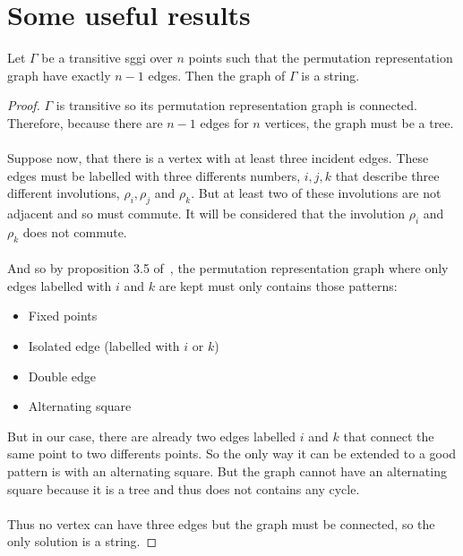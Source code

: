 \section{Some useful results}

\begin{lemma}\label{graphIsString}
  Let $\Gamma$ be a transitive sggi over $n$ points such that the permutation representation graph have exactly $n-1$ edges. Then the graph of $\Gamma$ is a string.
\end{lemma}

\begin{proof}
  $\Gamma$ is transitive so its permutation representation graph is connected. Therefore, because there are $n-1$ edges for $n$ vertices, the graph must be a tree.

  \paragraph{}
  Suppose now, that there is a vertex with at least three incident edges. These edges must be labelled with three differents numbers, $i, j, k$ that describe three different involutions, $\rho_i, \rho_j$ and $\rho_k$. But at least two of these involutions are not adjacent and so must commute. It will be considered that the involution $\rho_i$ and $\rho_k$ does not commute.

  \paragraph{}
  And so by proposition 3.5 of~\cite{cprGraph}, the permutation representation graph where only edges labelled with $i$ and $k$ are kept must only contains those patterns:
  \begin{itemize}
    \item Fixed points
    \item Isolated edge (labelled with $i$ or $k$)
    \item Double edge
    \item Alternating square
  \end{itemize}
  But in our case, there are already two edges labelled $i$ and $k$ that connect the same point to two differents points. So the only way it can be extended to a good pattern is with an alternating square. But the graph cannot have an alternating square because it is a tree and thus does not contains any cycle.

  \paragraph{}
  Thus no vertex can have three edges but the graph must be connected, so the only solution is a string.
\end{proof}

